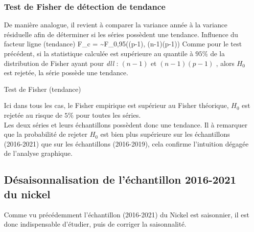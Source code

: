 \subsubsection*{Test de Fisher de détection de tendance}
De manière analogue, il revient à comparer la variance année à la variance résiduelle afin de déterminer si les séries possèdent une tendance.
    {Influence du facteur ligne (tendance)}
    {F_{c} =  \sim F_{0,95}((p-1), (n-1)(p-1))}
Comme pour le test précédent, si la statistique calculée est supérieure au quantile à $ 95\% $ 
de la distribution de Fisher ayant pour \textit{dll} : $(n-1)$ et $(n-1)(p-1)$ , alors $ H_{0} $ est rejetée, la série possède une tendance.
\begin{table}[H]
    \centering
    \caption{Test de Fisher (tendance)}
    \sffamily
    
\end{table}
Ici dans tous les cas, le Fisher empirique est supérieur au Fisher théorique, $H_{0}$ est rejetée
au risque de $ 5\% $ pour toutes les séries. \\[11pt]
Les deux séries et leurs échantillons possèdent donc une tendance. Il à remarquer que la probabilité de rejeter 
$H_{0}$ est bien plus supérieure sur les échantillons (2016-2021) que sur les échantillons (2016-2019),
cela confirme l'intuition dégagée de l'analyse graphique.

\subsection{Désaisonnalisation de l'échantillon 2016-2021 du nickel}
Comme vu précédemment l'échantillon (2016-2021) du Nickel est saisonnier, il est donc indispensable d'étudier, puis de corriger la saisonnalité. 
